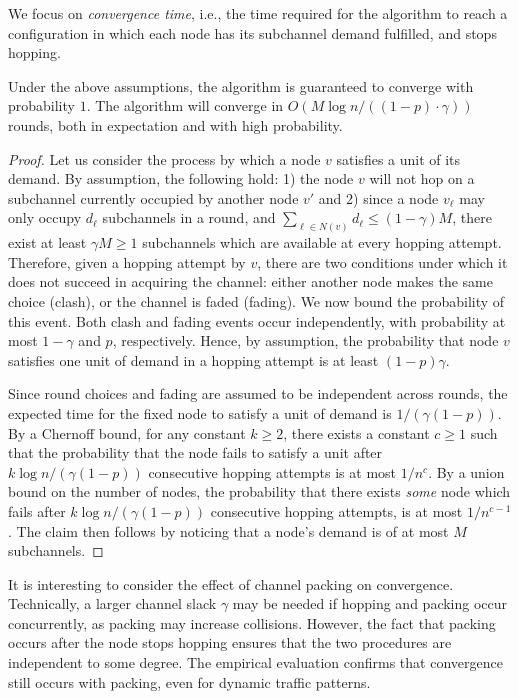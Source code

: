We focus on \emph{convergence time}, i.e., the time required for the algorithm to reach a configuration in which each node has its subchannel demand fulfilled, and stops hopping. 
\begin{thm}
\label{thm:convergence}
	Under the above assumptions, the algorithm is guaranteed to converge with probability $1$. The algorithm will converge in $O( M \log n / ((1 - p) \cdot \gamma) )$ rounds, both in expectation and with high probability.   
\end{thm}
\begin{proof}
	Let us consider the process by which a node $v$ satisfies a unit of its demand. By assumption, the following hold: 1) the node $v$ will not hop on a subchannel currently occupied by another node $v'$ and 2) since a node $v_\ell$ may only occupy $d_\ell$ subchannels in a round, and $\sum_{\ell \in N(v)} d_\ell \leq (1 - \gamma) M$, there exist at least $\gamma M \geq 1$ subchannels which are available at every hopping attempt. Therefore, given a hopping attempt by $v$, there are two conditions under which it does not succeed in acquiring the channel: either another node makes the same choice (clash), or the channel is faded (fading). We now bound the probability of this event.  
	Both clash and fading events occur independently, with probability at most $1 - \gamma$ and $p$, respectively. Hence, by assumption, the probability that node $v$ satisfies one unit of demand in a hopping attempt is at least $(1 - p) \gamma$.  
	
	Since round choices and fading are assumed to be independent across rounds, the expected time for the fixed node to satisfy a unit of demand is $ 1 / (\gamma (1 - p))$. By a Chernoff bound, for any constant $k \geq 2$, there exists a constant $c \geq 1$ such that the probability that the node fails to satisfy a unit after $k \log n / (\gamma (1 - p) )$ consecutive hopping attempts is at most $1 / n^c$. 
	By a union bound on the number of nodes, the probability that there exists \emph{some} node which fails after $k \log n / (\gamma (1 - p ))$ consecutive hopping attempts, is at most $1 / n^{c - 1}$. 
	The claim then follows by noticing that a node's demand is of at most $M$ subchannels. 
\end{proof}


It is interesting to consider the effect of channel packing on convergence. 
Technically, a larger channel slack $\gamma$ may be needed if hopping and packing occur concurrently, as packing may increase collisions. 
However, the fact that packing occurs after the node stops hopping ensures that the two procedures are independent to some degree.
The empirical evaluation confirms that convergence still occurs with packing, even for dynamic traffic patterns. 


